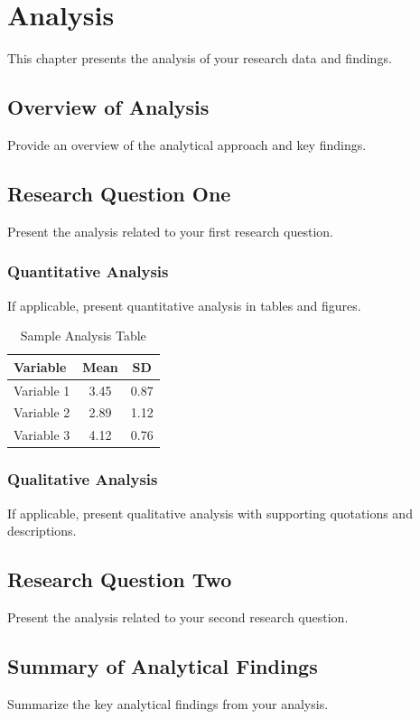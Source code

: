 \chapter{Analysis}

This chapter presents the analysis of your research data and findings.

\section{Overview of Analysis}

Provide an overview of the analytical approach and key findings.

\section{Research Question One}

Present the analysis related to your first research question.

\subsection{Quantitative Analysis}

If applicable, present quantitative analysis in tables and figures.

\begin{table}[H]
\centering
\caption{Sample Analysis Table}
\label{tab:analysis1}
\begin{tabular}{lcc}
\toprule
\textbf{Variable} & \textbf{Mean} & \textbf{SD} \\
\midrule
Variable 1 & 3.45 & 0.87 \\
Variable 2 & 2.89 & 1.12 \\
Variable 3 & 4.12 & 0.76 \\
\bottomrule
\end{tabular}
\end{table}

\subsection{Qualitative Analysis}

If applicable, present qualitative analysis with supporting quotations and descriptions.

\section{Research Question Two}

Present the analysis related to your second research question.

\section{Summary of Analytical Findings}

Summarize the key analytical findings from your analysis.

\newpage
